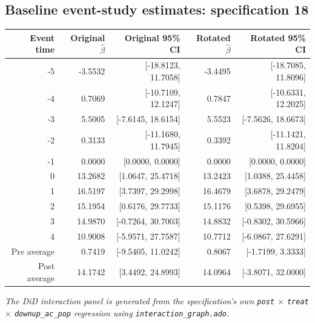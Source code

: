 \documentclass[10pt]{article}
\begin{document}
\subsection*{Baseline event-study estimates: specification 18}
\begin{center}
\scriptsize
\begin{tabular}{r rr rr}
\toprule
Event time & Original $\hat\beta$ & Original 95\% CI & Rotated $\hat\beta$ & Rotated 95\% CI \\
\midrule
-5 & -3.5532 & [-18.8123, 11.7058] & -3.4495 & [-18.7085, 11.8096] \\
-4 & 0.7069 & [-10.7109, 12.1247] & 0.7847 & [-10.6331, 12.2025] \\
-3 & 5.5005 & [-7.6145, 18.6154] & 5.5523 & [-7.5626, 18.6673] \\
-2 & 0.3133 & [-11.1680, 11.7945] & 0.3392 & [-11.1421, 11.8204] \\
-1 & 0.0000 & [0.0000, 0.0000] & 0.0000 & [0.0000, 0.0000] \\
0 & 13.2682 & [1.0647, 25.4718] & 13.2423 & [1.0388, 25.4458] \\
1 & 16.5197 & [3.7397, 29.2998] & 16.4679 & [3.6878, 29.2479] \\
2 & 15.1954 & [0.6176, 29.7733] & 15.1176 & [0.5398, 29.6955] \\
3 & 14.9870 & [-0.7264, 30.7003] & 14.8832 & [-0.8302, 30.5966] \\
4 & 10.9008 & [-5.9571, 27.7587] & 10.7712 & [-6.0867, 27.6291] \\
\midrule
Pre average & 0.7419 & [-9.5405, 11.0242] & 0.8067 & [-1.7199, 3.3333] \\
Post average & 14.1742 & [3.4492, 24.8993] & 14.0964 & [-3.8071, 32.0000] \\
\bottomrule
\end{tabular}
\end{center}
\medskip
\textit{The DiD interaction panel is generated from the specification's own \texttt{post} $\times$ \texttt{treat} $\times$ \texttt{downup\_ac\_pop} regression using \texttt{interaction\_graph.ado}.}
\clearpage
\end{document}
